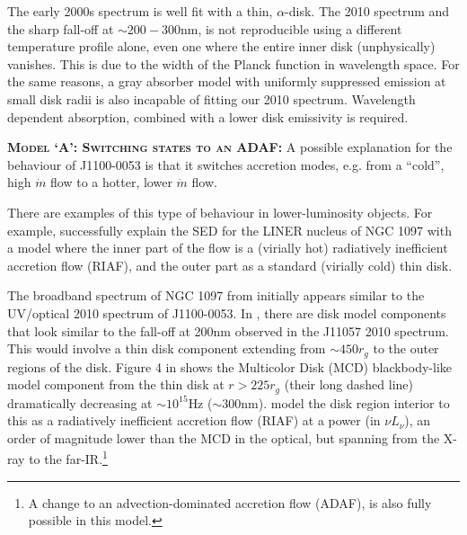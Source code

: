 \documentclass[11pt,a4paper]{article}
\begin{document}
The early 2000s spectrum is well fit with a thin, \citet{SS73}
$\alpha$-disk. The 2010 spectrum and the sharp fall-off at $\sim
200-300$nm, is not reproducible using a different temperature profile
alone, even one where the entire inner disk (unphysically)
vanishes. This is due to the width of the Planck function in
wavelength space. For the same reasons, a gray absorber model with
uniformly suppressed emission at small disk radii is also incapable of
fitting our 2010 \citep[or ][]{Guo2016} spectrum. Wavelength dependent
absorption, combined with a lower disk emissivity is required.


\smallskip \smallskip
\noindent
\textbf{\textsc{Model `A': Switching states to an ADAF: }} A possible
explanation for the behaviour of J1100-0053 is that it switches
accretion modes, e.g. from a ``cold'', high $\dot{m}$ flow to a
hotter, lower $\dot{m}$ flow.

There are examples of this type of behaviour in lower-luminosity
objects.  For example, \citet{Nemmen2006} successfully explain the SED
for the LINER nucleus of NGC 1097 with a model where the inner part of
the flow is a (virially hot) radiatively inefficient accretion flow
(RIAF), and the outer part as a standard (virially cold) thin disk.

The broadband spectrum of NGC 1097 from \citet{Nemmen2006} initially
appears similar to the UV/optical 2010 spectrum of J1100-0053.  In
\citet[][e.g., their Figure 4]{Nemmen2006}, there are disk model
components that look similar to the fall-off at 200nm observed in the
J11057 2010 spectrum. This would involve a thin disk component
extending from $\sim 450r_{g}$ to the outer regions of the
disk. Figure 4 in \citet{Nemmen2006} shows the Multicolor Disk (MCD)
blackbody-like model component from the thin disk at $r>225r_{g}$
(their long dashed line) dramatically decreasing at $\sim 10^{15}$Hz
($\sim 300$nm). \citet{Nemmen2006} model the disk region interior to
this as a radiatively inefficient accretion flow (RIAF) at a power (in
$\nu L_{\nu}$), an order of magnitude lower than the MCD in the
optical, but spanning from the X-ray to the far-IR.\footnote{A change
to an advection-dominated accretion flow (ADAF), is also fully
possible in this model.}
\end{document}
